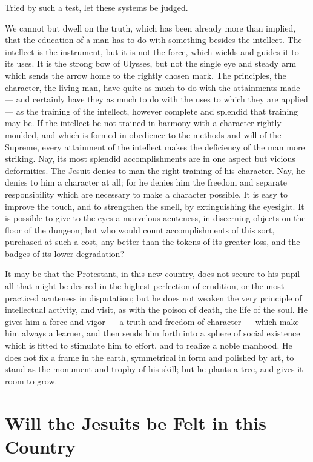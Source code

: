 \documentclass[]{book}
\begin{document}
Tried by such a test, let these systems be judged.

We cannot but dwell on the truth, which has been already more than implied, that the education of a man has to do with something besides the intellect. The intellect is the instrument, but it is not the force, which wields and guides it to its uses. It is the strong bow of Ulysses, but not the single eye and steady arm which sends the arrow home to the rightly chosen mark. The principles, the character, the living man, have quite as much to do with the attainments made --- and certainly have they as much to do with the uses to which they are applied --- as the training of the intellect, however complete and splendid that training may be. If the intellect be not trained in harmony with a character rightly moulded, and which is formed in obedience to the methods and will of the Supreme, every attainment of the intellect makes the deficiency of the man more striking. Nay, its most splendid accomplishments are in one aspect but vicious deformities. The Jesuit denies to man the right training of his character. Nay, he denies to him a character at all; for he denies him the freedom and separate responsibility which are necessary to make a character possible. It is easy to improve the touch, and to strengthen the smell, by extinguishing the eyesight. It is possible to give to the eyes a marvelous acuteness, in discerning objects on the floor of the dungeon; but who would count accomplishments of this sort, purchased at such a cost, any better than the tokens of its greater loss, and the badges of its lower degradation?

It may be that the Protestant, in this new country, does not secure to his pupil all that might be desired in the highest perfection of erudition, or the most practiced acuteness in disputation; but he does not weaken the very principle of intellectual activity, and visit, as with the poison of death, the life of the soul. He gives him a force and vigor --- a truth and freedom of character --- which make him always a learner, and then sends him forth into a sphere of social existence which is fitted to stimulate him to effort, and to realize a noble manhood. He does not fix a frame in the earth, symmetrical in form and polished by art, to stand as the monument and trophy of his skill; but he plants a tree, and gives it room to grow.

\hypertarget{will-the-jesuits-be-felt-in-this-country}{%
\chapter{Will the Jesuits be Felt in this Country}\label{will-the-jesuits-be-felt-in-this-country}}
\end{document}

